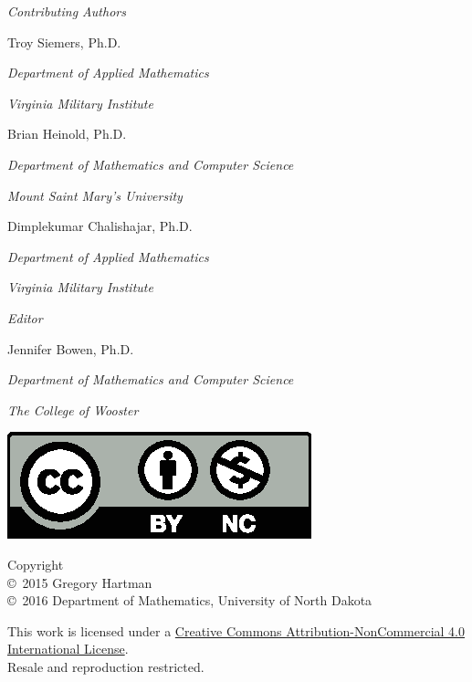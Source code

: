 
\textit{Contributing Authors}

Troy Siemers, Ph.D.

\emph{\small Department of Applied Mathematics}

\emph{\small Virginia Military Institute}\bigskip

Brian Heinold, Ph.D.

\emph{\small Department of Mathematics and Computer Science}

\emph{\small Mount Saint Mary's University}\bigskip

Dimplekumar Chalishajar, Ph.D.

\emph{\small Department of Applied Mathematics}

\emph{\small Virginia Military Institute}\bigskip\medskip

\textit{Editor}

Jennifer Bowen, Ph.D.

\emph{\small Department of Mathematics and Computer Science}

\emph{\small The College of Wooster}


\noindent\hspace{-1in}\begin{minipage}{2in}
\href{http://creativecommons.org/licenses/by-nc/4.0/}{\includegraphics{text/by-nc}}
\end{minipage}%
\begin{minipage}{3in}
\noindent Copyright\\
\copyright\ 2015 Gregory Hartman\\
\copyright\ 2016 Department of Mathematics, University of North Dakota

This work is licensed under a \href{http://creativecommons.org/licenses/by-nc/4.0/}{Creative Commons Attribution-NonCommercial 4.0 International License}.\\
Resale and reproduction restricted.
\end{minipage}

